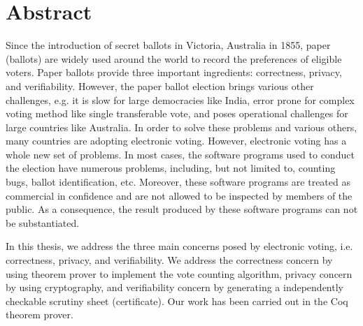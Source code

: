 \chapter*{Abstract}
\setlength{\parindent}{2em}
\setlength{\parskip}{1em}



Since the introduction of secret ballots in Victoria, Australia in 1855, 
paper (ballots) are widely used around the world to record 
the preferences of eligible voters. Paper ballots provide three 
important ingredients: correctness, privacy, and verifiability. 
However, the paper ballot election brings various  other challenges, e.g. 
it is slow for large democracies like India,  error prone for complex voting method 
like single transferable vote, and poses operational challenges for 
large countries like Australia. In order to solve these problems and various others, 
many countries are adopting electronic voting. However, 
electronic voting has a whole new set of problems. In most cases, the software 
programs used to conduct the election have numerous problems, including, but not limited to, 
counting bugs, ballot identification, etc. Moreover, 
these software programs are treated as commercial in confidence and 
are not allowed to be inspected by members of the public. 
As a consequence, the result produced by these software programs 
can not be substantiated.

In this thesis, we address the three main concerns posed by electronic voting, i.e. 
correctness, privacy, and verifiability. We address the correctness concern by using 
theorem prover to implement the vote counting algorithm, 
privacy concern by using  cryptography,  and verifiability concern 
by generating a independently checkable scrutiny sheet (certificate). Our work 
has been carried out in the Coq theorem prover.

